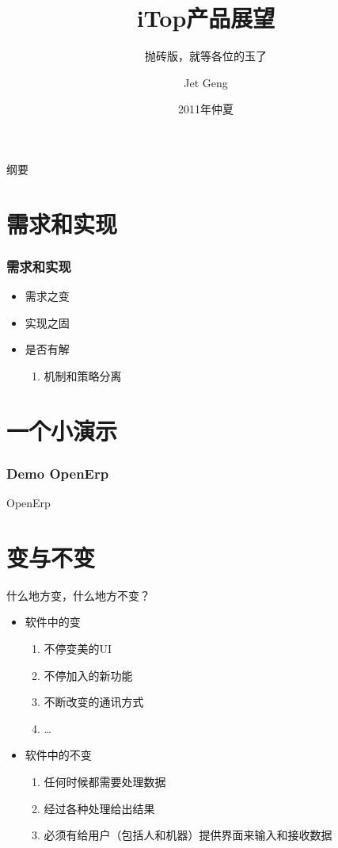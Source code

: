 \documentclass{beamer}
\title[iTop产品展望]{iTop产品展望}
\subtitle[LaTeX for slide]{抛砖版，就等各位的玉了}
\author[Jet Geng]{Jet Geng}
\institute[zthz.com.cn]{中天合志研发中心}
\date[Dec, 2011]{2011年仲夏}
\begin{document}
\begin{frame}
	\titlepage
\end{frame}

\begin{frame}{纲要}
 	\tableofcontents
 \end{frame}

\section{需求和实现}
\begin{frame}
    \frametitle{需求和实现}
    \pause
    \begin{itemize}
        \item 需求之变
        \item 实现之固
        \item 是否有解
            \begin{enumerate}
                \item 机制和策略分离
            \end{enumerate}
    \end{itemize}
\end{frame}

\section{一个小演示}
\begin{frame}
    \frametitle{Demo OpenErp}
    \pause
     \begin{centering}
      \Huge OpenErp \par
    \end{centering}
\end{frame}

\section{变与不变}
\begin{frame}{什么地方变，什么地方不变？}
    \begin{itemize}
    \pause
        \item 软件中的变
            \begin{enumerate}
                \item 不停变美的UI
                \item 不停加入的新功能
                \item 不断改变的通讯方式
                \item \ldots 
            \end{enumerate}
        \item 软件中的不变
            \begin{enumerate}
                \item 任何时候都需要处理数据
                \item 经过各种处理给出结果
                \item 必须有给用户（包括人和机器）提供界面来输入和接收数据
            \end{enumerate}
    \end{itemize}
\end{frame}
\end{document}
